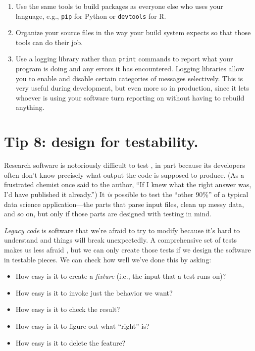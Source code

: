 \documentclass[10pt,letterpaper]{article}
\begin{document}
\begin{enumerate}

\item
  Use the same tools to build packages as everyone else who uses your language,
  e.g., \texttt{pip} for Python or \texttt{devtools} for R.

\item
  Organize your source files in the way your build system expects
  so that those tools can do their job.

\item
  Use a logging library rather than \texttt{print} commands
  to report what your program is doing and any errors it has encountered.
  Logging libraries allow you to enable and disable certain categories of messages selectively.
  This is very useful during development,
  but even more so in production,
  since it lets whoever is using your software turn reporting on
  without having to rebuild anything.

\end{enumerate}

\section*{Tip 8: design for testability.}

Research software is notoriously difficult to test \cite{Hook2009,Kanewala2014},
in part because its developers often don't know precisely what output the code is supposed to produce.
(As a frustrated chemist once said to the author,
``If I knew what the right answer was, I'd have published it already.'')
It \emph{is} possible to test the ``other 90\%'' of a typical data science application---the parts that
parse input files,
clean up messy data,
and so on,
but only if those parts are designed with testing in mind.

\emph{Legacy code} is software that we're afraid to try to modify
because it's hard to understand and things will break unexpectedly.
A comprehensive set of tests makes us less afraid \cite{Feathers2004},
but we can only create those tests if we design the software in testable pieces.
We can check how well we've done this by asking:

\begin{itemize}
\item
  How easy is it to create a \emph{fixture}
  (i.e., the input that a test runs on)?
\item
  How easy is it to invoke just the behavior we want?
\item
  How easy is it to check the result?
\item
  How easy is it to figure out what ``right'' is?
\item
  How easy is it to delete the feature?
\end{itemize}
\end{document}
